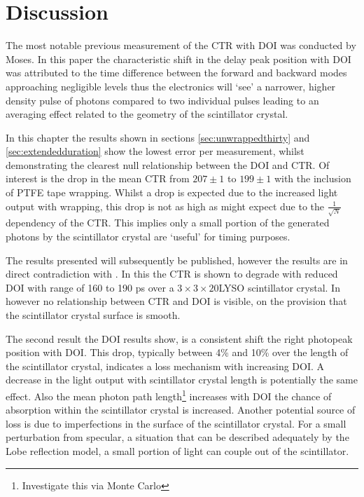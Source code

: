 \section{Discussion}
The most notable previous measurement of the CTR with DOI was conducted by Moses\cite{Moses1999}. In this paper the characteristic shift in the delay peak position with DOI was attributed to the time difference between the forward and backward modes approaching negligible levels thus the electronics will `see' a narrower, higher density pulse of photons compared to two individual pulses leading to an averaging effect related to the geometry of the scintillator crystal. 

In this chapter the results shown in sections \ref{sec:unwrappedthirty} and \ref{sec:extendedduration} show the lowest error per measurement, whilst demonstrating the clearest null relationship between the DOI and CTR.  Of interest is the drop in the mean CTR from $207\pm1$ to $199\pm1$ with the inclusion of PTFE tape wrapping. Whilst a drop is expected due to the increased light output with wrapping, this drop is not as high as might expect due to the $\frac{1}{\sqrt{N}}$ dependency of the CTR. This implies only a small portion of the generated photons by the scintillator crystal are `useful' for timing purposes.

The results presented will subsequently be published, however the results are in direct contradiction with \cite{Yeom2013}. In this the CTR is shown to degrade with reduced DOI with range of 160 to 190 ps over a $3\times3\times20$\mmc LYSO scintillator crystal. In \cite{Bircher2012} however no relationship between CTR and DOI is visible, on the provision that the scintillator crystal surface is smooth.

The second result the DOI results show, is a consistent shift the right photopeak position with DOI. This drop, typically between 4\% and 10\% over the length of the scintillator crystal, indicates a loss mechanism with increasing DOI. A decrease in the light output with scintillator crystal length\cite{Moszyixki1997} is potentially the same effect. Also the mean photon path length\footnote{Investigate this via Monte Carlo} increases with DOI the chance of absorption within the scintillator crystal is increased. Another potential source of loss is due to imperfections in the surface of the scintillator crystal. For a small perturbation from specular, a situation that can be described adequately by the Lobe reflection model\cite{Janecek2010a}, a small portion of light can couple out of the scintillator.